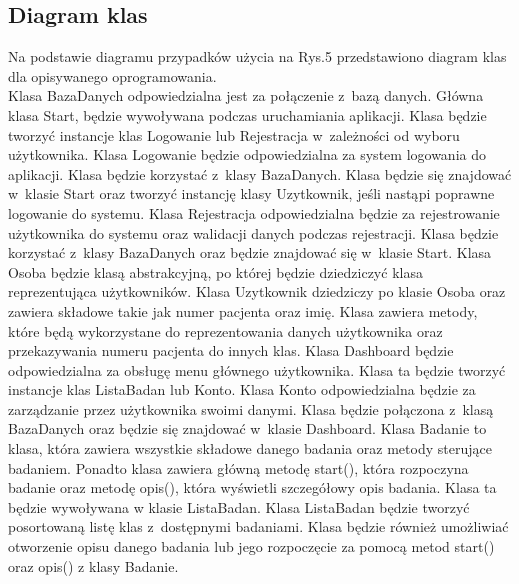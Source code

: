 \documentclass[12pt, letterpaper]{article}
\begin{document}
		
\newpage
		\subsection{Diagram klas}
		
		Na podstawie diagramu przypadków użycia na Rys.5 przedstawiono diagram klas dla opisywanego oprogramowania.\\	
		
		Klasa {\selectfont BazaDanych} odpowiedzialna jest za połączenie z~bazą danych. Główna klasa {\selectfont Start}, będzie wywoływana podczas uruchamiania aplikacji. Klasa będzie tworzyć instancje klas Logowanie lub Rejestracja w~zależności od wyboru użytkownika. Klasa {\selectfont Logowanie} będzie odpowiedzialna za system logowania do aplikacji. Klasa będzie korzystać z~klasy BazaDanych. Klasa będzie się znajdować w~klasie Start oraz tworzyć instancję klasy Uzytkownik, jeśli nastąpi poprawne logowanie do systemu. Klasa {\selectfont Rejestracja} odpowiedzialna będzie za rejestrowanie użytkownika do systemu oraz walidacji danych podczas rejestracji. Klasa będzie korzystać z~klasy BazaDanych oraz będzie znajdować się w~klasie Start. Klasa {\selectfont Osoba} będzie klasą abstrakcyjną, po której będzie dziedziczyć klasa reprezentująca użytkowników. Klasa {\selectfont Uzytkownik} dziedziczy po klasie Osoba oraz zawiera składowe takie jak numer pacjenta oraz imię. Klasa zawiera metody, które będą wykorzystane do reprezentowania danych użytkownika oraz przekazywania numeru pacjenta do innych klas. Klasa {\selectfont Dashboard} będzie odpowiedzialna za obsługę menu głównego użytkownika. Klasa ta będzie tworzyć instancje klas ListaBadan lub Konto. Klasa {\selectfont Konto} odpowiedzialna będzie za zarządzanie przez użytkownika swoimi danymi. Klasa będzie połączona z~klasą BazaDanych oraz będzie się znajdować w~klasie Dashboard. Klasa {\selectfont Badanie} to klasa, która zawiera wszystkie składowe danego badania oraz metody sterujące badaniem. Ponadto klasa zawiera główną metodę start(), która rozpoczyna badanie oraz metodę opis(), która wyświetli szczegółowy opis badania. Klasa ta będzie wywoływana w klasie ListaBadan. Klasa {\selectfont ListaBadan} będzie tworzyć posortowaną listę klas z~dostępnymi badaniami. Klasa będzie również umożliwiać otworzenie opisu danego badania lub jego rozpoczęcie za pomocą metod start() oraz opis() z klasy Badanie.\\
		
\end{document}
